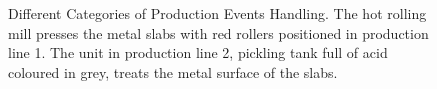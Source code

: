  \begin{figure}[!ht]
	\begin{center}
		\caption{Different Categories of Production Events Handling. The hot rolling mill presses the metal slabs with red rollers positioned in production line 1. The unit in production line 2, pickling tank full of acid coloured in grey, treats the metal surface of the slabs.
		}
		\label{figure-hypothetical_constraints}
	\end{center}
\end{figure}
